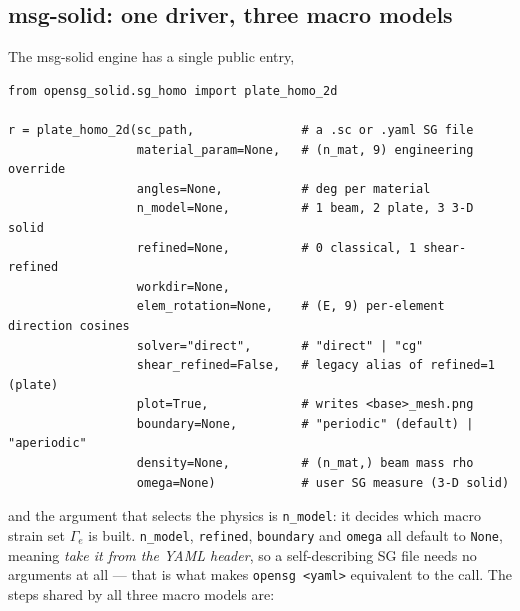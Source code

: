 \subsection{msg-solid: one driver, three macro models}
\label{sec:pipe-solid}

The msg-solid engine has a single public entry,

\begin{lstlisting}[style=opensg,caption={The msg-solid driver signature: n\_model selects which macro strain set is built.},basicstyle=\ttfamily\footnotesize]
from opensg_solid.sg_homo import plate_homo_2d

r = plate_homo_2d(sc_path,               # a .sc or .yaml SG file
                  material_param=None,   # (n_mat, 9) engineering override
                  angles=None,           # deg per material
                  n_model=None,          # 1 beam, 2 plate, 3 3-D solid
                  refined=None,          # 0 classical, 1 shear-refined
                  workdir=None,
                  elem_rotation=None,    # (E, 9) per-element direction cosines
                  solver="direct",       # "direct" | "cg"
                  shear_refined=False,   # legacy alias of refined=1 (plate)
                  plot=True,             # writes <base>_mesh.png
                  boundary=None,         # "periodic" (default) | "aperiodic"
                  density=None,          # (n_mat,) beam mass rho
                  omega=None)            # user SG measure (3-D solid)
\end{lstlisting}

\noindent
and the argument that selects the physics is \texttt{n\_model}: it decides which
macro strain set $\Gamma_e$ is built. \texttt{n\_model}, \texttt{refined},
\texttt{boundary} and \texttt{omega} all default to \texttt{None}, meaning
\emph{take it from the YAML header}, so a self-describing SG file needs no
arguments at all --- that is what makes \texttt{opensg <yaml>} equivalent to
the call. The steps shared by all three macro models are:

